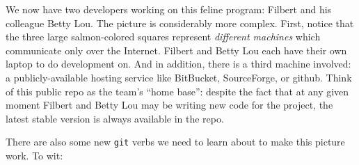 We now have two developers working on this feline program: Filbert and his
colleague Betty Lou. The picture is considerably more complex. First, notice
that the three large salmon-colored squares represent \textit{different machines}
which communicate only over the Internet. Filbert and Betty Lou each have
their own laptop to do development on. And in addition, there is a third
machine involved: a publicly-available hosting service like BitBucket,
SourceForge, or github. Think of this public repo as the team's ``home base'':
despite the fact that at any given moment Filbert and Betty Lou may be writing
new code for the project, the latest stable version is always available in the
repo.

There are also some new \texttt{git} verbs we need to learn about to make this
picture work. To wit:

